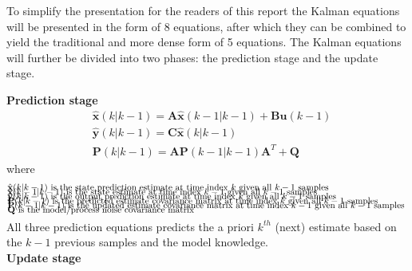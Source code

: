 To simplify the presentation for the readers of this report the Kalman equations will be presented in the form of 8 equations, after which they can be combined to yield the traditional and more dense form of 5 equations.
The Kalman equations will further be divided into two phases: the prediction stage and the update stage. 

\textbf{Prediction stage}
\begin{align}
	&\hat{\textbf{x}}	(k|k-1) = \textbf{A} 	\hat{\textbf{x}}(k-1|k-1) + \textbf{B}\textbf{u}(k-1)  				\label{eq:Kalman_pred_state} 	\\
	&\hat{\textbf{y}}	(k|k-1) = \textbf{C}	\hat{\textbf{x}}(k|k-1)										\label{eq:Kalman_pred_output} 	\\
	&\textbf{P}			(k|k-1) = \textbf{A}	\textbf{P}(k-1|k-1)\textbf{A}^T+\textbf{Q} 								\label{eq:Kalman_pred_cov} 		
\end{align}
where 
\begin{align*}
	&\text{$\hat{\textbf{x}}	(k|k-1)$ 	is the state prediction 			estimate at time index $k$ 		given all $ k-1 $ samples		}	\\[-1em]
	&\text{$\hat{\textbf{x}}	(k-1|k-1)$ 	is the state 						estimate at time index $k-1$ 	given all $ k-1 $ samples		}	\\[-1em]
	&\text{$\hat{\textbf{y}}	(k|k-1)$ 	is the output prediction 			estimate at time index $k$ 		given all $ k-1 $ samples		}	\\[-1em]
	&\text{$\textbf{P}			(k|k-1)$ 	is the predicted estimate  covariance matrix at time index $k$ 		given all $ k-1 $ samples		}	\\[-1em]
	&\text{$\textbf{P}			(k-1|k-1)$ 	is the updated estimate    covariance matrix at time index $k-1$ 	given all $ k-1 $ samples		}	\\[-1em]
	&\text{$\textbf{Q}$						is the model/process noise covariance matrix														}	\\[-1em]
\end{align*}

All three prediction equations predicts the a priori $k^{th}$ (next) estimate based on the $k-1$ previous samples and the model knowledge.\\

\textbf{Update stage}

